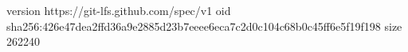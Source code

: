 version https://git-lfs.github.com/spec/v1
oid sha256:426e47dea2ffd36a9e2885d23b7eeee6eca7c2d0c104c68b0c45ff6e5f19f198
size 262240

